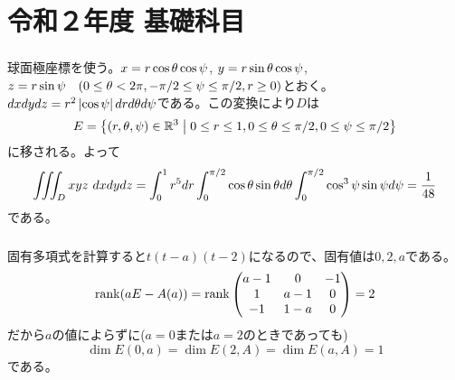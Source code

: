 \section{令和２年度 基礎科目}

\subsubsection{}%
\begin{sol}
  球面極座標を使う。$x = r \cos {\theta} \cos \psi$, $y = r \sin {\theta} \cos \psi$, $z = r \sin \psi \quad (0 \leq {\theta} < 2 \pi, -\pi/2 \leq \psi \leq \pi/2, r \geq 0)$とおく。
  $dx dy dz = r^2 \left \lvert \cos \psi \right \rvert dr d{\theta} d\psi$である。この変換により$D$は
  \[
  E = \left\{  (r , {\theta} , \psi)  \in {\mathbb R}^3 \mathrel{} \middle| \mathrel{}  0\leq r \leq 1, 0 \leq {\theta} \leq \pi/2 , 0 \leq \psi \leq \pi/2 \right\}
  \]
  に移される。よって
  \begin{align*}
    \iiint_D xyz \ dx dy dz = \int_0^1 r^5 dr \int_0^{\pi/2} \cos {\theta} \sin {\theta} d{\theta} \int_0^{\pi/2} \cos^3 \psi \sin \psi d\psi = \frac{1}{48}
  \end{align*}
  である。
\end{sol}


\newpage

\subsubsection{}%
\begin{sol}
  固有多項式を計算すると$t(t-a)(t-2)$になるので、固有値は$0,2,a$である。
  \[
  \operatorname{rank}(aE - A(a)) = \operatorname{rank} \begin{pmatrix} a-1& 0& -1 \\ 1& a-1& 0 \\ -1 &1-a& 0  \end{pmatrix} = 2
  \]
  だから$a$の値によらずに($a=0$または$a=2$のときであっても)
  \[
  \dim E(0,a) = \dim E(2,A) = \dim E(a,A) = 1
  \]
  である。
\end{sol}


\newpage

